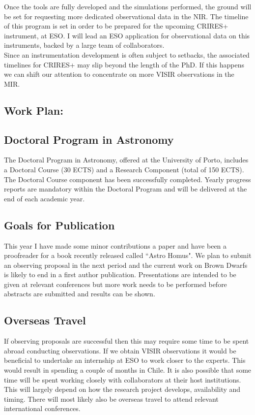 \documentclass[pdftex,12pt,a4paper]{article}
\begin{document}
Once the tools are fully developed and the simulations performed, the ground will be set for requesting more dedicated observational data in the NIR. The timeline of this program is set in order to be prepared for the upcoming CRIRES+ instrument, at ESO. I will lead an ESO application for observational data on this instruments, backed by a large team of collaborators. \\

Since an instrumentation development is often subject to setbacks, the associated timelines for CRIRES+ may slip beyond the length of the PhD. If this happens we can shift our attention to concentrate on more VISIR observations in the MIR.


\subsection{Work Plan:}
\subsection*{Doctoral Program in Astronomy}
The Doctoral Program in Astronomy, offered at the University of Porto, includes a Doctoral Course (30 ECTS) and a Research Component (total of 150 ECTS). The Doctoral Course component has been successfully completed. Yearly progress reports are mandatory within the Doctoral Program and will be delivered at the end of each academic year.

\subsection*{Goals for Publication}
This year I have made some minor contributions a paper \citep{Figueria2015prep} and have been a proofreader for a book recently released called ``Astro Homus". We plan to submit an observing proposal in the next period and the current work on Brown Dwarfs is likely to end in a first author publication. Presentations are intended to be given at relevant conferences but more work needs to be performed before abstracts are submitted and results can be shown. \\

\subsection*{Overseas Travel}
If observing proposals are successful then this may require some time to be spent abroad conducting observations. If we obtain VISIR observations it would be beneficial to undertake an internship at ESO to work closer to the experts. This would result in spending a couple of months in Chile. It is also possible that some time will be spent working closely with collaborators at their host institutions. This will largely depend on how the research project develops, availability and timing. There will most likely also be overseas travel to attend relevant international conferences.
\end{document}
